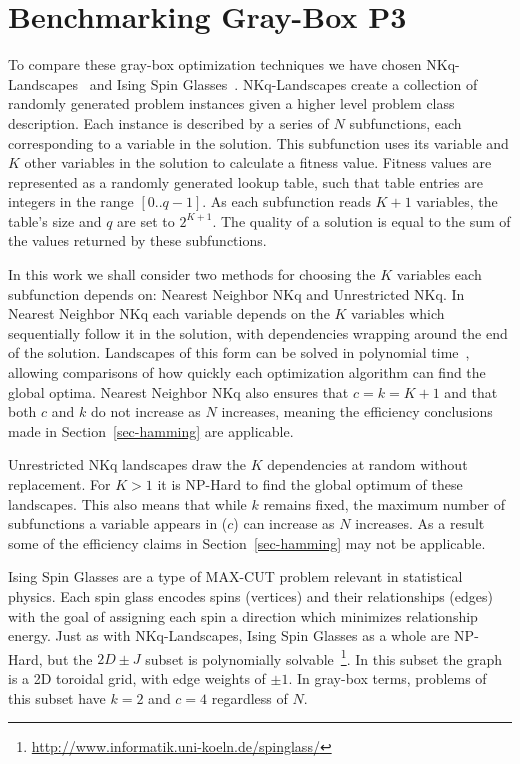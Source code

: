 \chapter{Benchmarking Gray-Box P3}
To compare these gray-box optimization techniques we have chosen
NKq-Landscapes~\cite{chicano:2014:ball} and Ising Spin Glasses~\cite{saul:1994:spinglass}. NKq-Landscapes create
a collection of randomly generated problem instances given a
higher level problem class description. Each instance is described
by a series of $N$ subfunctions, each corresponding to a variable
in the solution. This subfunction uses its variable and $K$ other
variables in the solution to calculate a fitness value. Fitness values
are represented as a randomly generated lookup table, such that table
entries are integers in the range $[0..q-1]$. As each subfunction reads
$K+1$ variables, the table's size and $q$ are set to $2^{K+1}$. The quality
of a solution is equal to the sum of the values returned by these subfunctions.

In this work we shall consider two methods for choosing the $K$ variables
each subfunction depends on: Nearest Neighbor NKq and Unrestricted NKq.
In Nearest Neighbor NKq each variable depends on the $K$ variables which sequentially follow
it in the solution, with dependencies wrapping around the end of the solution.
Landscapes of this form can be solved in polynomial
time~\cite{wright:2000:solvingnk}, allowing comparisons of how quickly each optimization
algorithm can find the global optima. Nearest Neighbor NKq also ensures that $c=k=K+1$
and that both $c$ and $k$ do not increase as $N$ increases, meaning the efficiency
conclusions made in Section~\ref{sec-hamming} are applicable.

Unrestricted NKq landscapes draw the $K$ dependencies at random without replacement. For $K > 1$ it is
NP-Hard to find the global optimum of these landscapes. This also means that while
$k$ remains fixed, the maximum number of subfunctions a variable appears in ($c$) can increase
as $N$ increases. As a result some of the efficiency claims in Section~\ref{sec-hamming}
may not be applicable.

Ising Spin Glasses are a type of MAX-CUT problem relevant in statistical physics. Each spin glass
encodes spins (vertices) and their relationships (edges) with the goal of assigning each spin a direction
which minimizes relationship energy. Just as with NKq-Landscapes, Ising Spin Glasses as a whole
are NP-Hard, but the $2D\pm J$ subset is polynomially solvable~\cite{saul:1994:spinglass}\footnote{\url{http://www.informatik.uni-koeln.de/spinglass/}}. In this
subset the graph is a 2D toroidal grid, with edge weights of $\pm 1$. In gray-box terms,
problems of this subset have $k=2$ and $c=4$ regardless of $N$.

